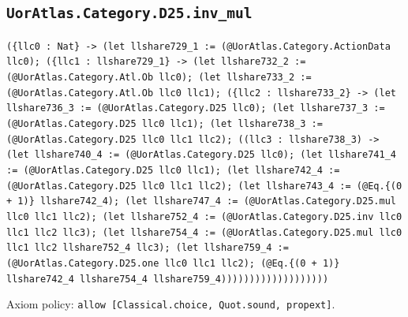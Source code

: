 \documentclass[11pt]{article}
\begin{document}
\subsection*{\texttt{UorAtlas.Category.D25.inv\_mul}}
\noindent\texttt{(\{llc0 : Nat\} -> (let llshare729\_1 := (@UorAtlas.Category.ActionData llc0); (\{llc1 : llshare729\_1\} -> (let llshare732\_2 := (@UorAtlas.Category.Atl.Ob llc0); (let llshare733\_2 := (@UorAtlas.Category.Atl.Ob llc0 llc1); (\{llc2 : llshare733\_2\} -> (let llshare736\_3 := (@UorAtlas.Category.D25 llc0); (let llshare737\_3 := (@UorAtlas.Category.D25 llc0 llc1); (let llshare738\_3 := (@UorAtlas.Category.D25 llc0 llc1 llc2); ((llc3 : llshare738\_3) -> (let llshare740\_4 := (@UorAtlas.Category.D25 llc0); (let llshare741\_4 := (@UorAtlas.Category.D25 llc0 llc1); (let llshare742\_4 := (@UorAtlas.Category.D25 llc0 llc1 llc2); (let llshare743\_4 := (@Eq.\{(0 + 1)\} llshare742\_4); (let llshare747\_4 := (@UorAtlas.Category.D25.mul llc0 llc1 llc2); (let llshare752\_4 := (@UorAtlas.Category.D25.inv llc0 llc1 llc2 llc3); (let llshare754\_4 := (@UorAtlas.Category.D25.mul llc0 llc1 llc2 llshare752\_4 llc3); (let llshare759\_4 := (@UorAtlas.Category.D25.one llc0 llc1 llc2); (@Eq.\{(0 + 1)\} llshare742\_4 llshare754\_4 llshare759\_4)))))))))))))))))))}\par
\noindent Axiom policy: \texttt{allow [Classical.choice, Quot.sound, propext]}.\par
\end{document}

